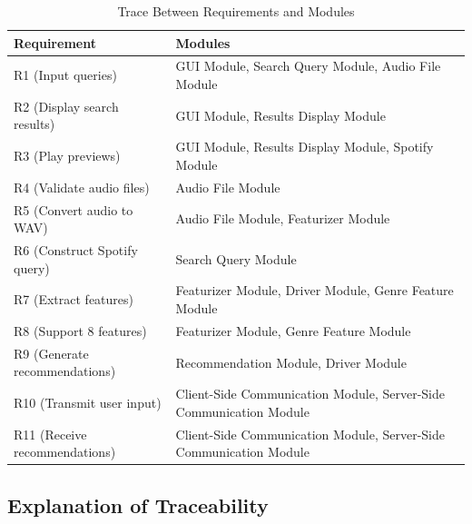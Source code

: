 \documentclass[12pt, titlepage]{article}
\begin{document}
\begin{table}[H]
\centering
\begin{tabular}{p{} p{}}
\toprule
\textbf{Requirement} & \textbf{Modules}\\
\midrule
R1 (Input queries) & GUI Module, Search Query Module, Audio File Module \\
R2 (Display search results) & GUI Module, Results Display Module \\
R3 (Play previews) & GUI Module, Results Display Module, Spotify Module \\
R4 (Validate audio files) & Audio File Module \\
R5 (Convert audio to WAV) & Audio File Module, Featurizer Module \\
R6 (Construct Spotify query) & Search Query Module \\
R7 (Extract features) & Featurizer Module, Driver Module, Genre Feature Module \\
R8 (Support 8 features) & Featurizer Module, Genre Feature Module \\
R9 (Generate recommendations) & Recommendation Module, Driver Module \\
R10 (Transmit user input) & Client-Side Communication Module, Server-Side Communication Module \\
R11 (Receive recommendations) & Client-Side Communication Module, Server-Side Communication Module \\
\bottomrule
\end{tabular}
\caption{Trace Between Requirements and Modules}
\label{TblRT}
\end{table}

\subsection{Explanation of Traceability}
\end{document}
